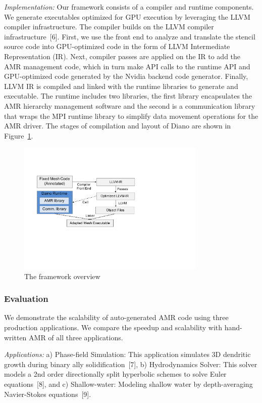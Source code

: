 \documentclass{book}
\begin{document}
\emph{Implementation:} Our framework consists of a compiler and runtime components. We generate executables optimized for GPU execution by leveraging the LLVM compiler infrastructure. The compiler builds on the LLVM compiler infrastructure~[6]. First, we use the front end to analyze and translate the stencil source code into GPU-optimized code in the form of LLVM Intermediate Representation (IR). Next, compiler passes are applied on the IR to add the AMR management code, which in turn make API calls to the runtime API and GPU-optimized code generated by the Nvidia backend code generator. Finally, LLVM IR is compiled and linked with the runtime libraries to generate and executable.
The runtime includes two libraries, the first library encapsulates the AMR hierarchy management software and the second is a communication library that wraps the MPI runtime library to simplify data movement operations for the AMR driver. The stages of compilation and layout of Diano are shown in Figure~\ref{fig:2}.
\begin{figure}[h]
\centering
\includegraphics[width=0.8\textwidth]{figs/amr02.pdf}%
\caption{The framework overview}
\label{fig:2}
\end{figure}
\subsubsection{Evaluation}
We demonstrate the scalability of auto-generated AMR code using three production applications. We compare the speedup and scalability with hand-written AMR of all three applications. 

\emph{Applications:} a) Phase-field Simulation: This application simulates 3D dendritic growth during binary ally solidification~[7], b) Hydrodynamics Solver: This solver models a 2nd order directionally split hyperbolic schemes to solve Euler equations~[8], and c) Shallow-water: Modeling shallow water by depth-averaging Navier-Stokes equations~[9].
\end{document}
